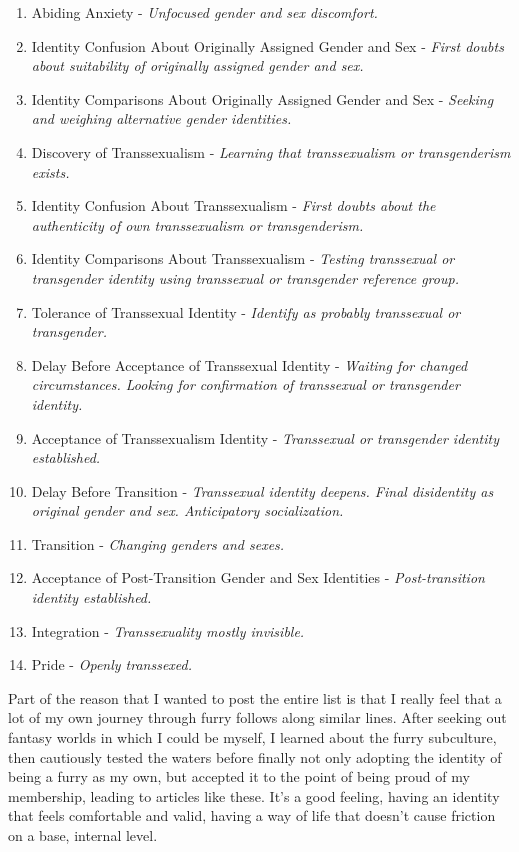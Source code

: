 \begin{enumerate}
\def\labelenumi{\arabic{enumi}.}
\tightlist
\item
  Abiding Anxiety - \emph{Unfocused gender and sex discomfort.}
\item
  Identity Confusion About Originally Assigned Gender and Sex -
  \emph{First doubts about suitability of originally assigned gender and
  sex.}
\item
  Identity Comparisons About Originally Assigned Gender and Sex -
  \emph{Seeking and weighing alternative gender identities.}
\item
  Discovery of Transsexualism - \emph{Learning that transsexualism or
  transgenderism exists.}
\item
  Identity Confusion About Transsexualism - \emph{First doubts about the
  authenticity of own transsexualism or transgenderism.}
\item
  Identity Comparisons About Transsexualism - \emph{Testing transsexual
  or transgender identity using transsexual or transgender reference
  group.}
\item
  Tolerance of Transsexual Identity - \emph{Identify as probably
  transsexual or transgender.}
\item
  Delay Before Acceptance of Transsexual Identity - \emph{Waiting for
  changed circumstances. Looking for confirmation of transsexual or
  transgender identity.}
\item
  Acceptance of Transsexualism Identity - \emph{Transsexual or
  transgender identity established.}
\item
  Delay Before Transition - \emph{Transsexual identity deepens. Final
  disidentity as original gender and sex. Anticipatory socialization.}
\item
  Transition - \emph{Changing genders and sexes.}
\item
  Acceptance of Post-Transition Gender and Sex Identities -
  \emph{Post-transition identity established.}
\item
  Integration - \emph{Transsexuality mostly invisible.}
\item
  Pride - \emph{Openly transsexed.}
\end{enumerate}

Part of the reason that I wanted to post the entire list is that I
really feel that a lot of my own journey through furry follows along
similar lines. After seeking out fantasy worlds in which I could be
myself, I learned about the furry subculture, then cautiously tested the
waters before finally not only adopting the identity of being a furry as
my own, but accepted it to the point of being proud of my membership,
leading to articles like these. It's a good feeling, having an identity
that feels comfortable and valid, having a way of life that doesn't
cause friction on a base, internal level.

